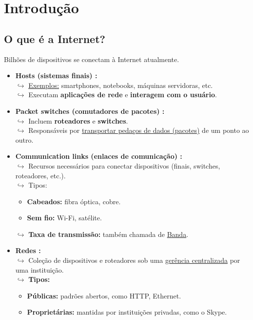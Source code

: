 \section{Introdução}

    \subsection{O que é a Internet?}

    Bilhões de dispositivos se conectam à Internet atualmente.

    \begin{itemize}
        \item \textbf{Hosts (sistemas finais) :} \\  
            $\hookrightarrow$ \underline{Exemplos:} smartphones, notebooks, máquinas servidoras, etc. \\  
            $\hookrightarrow$ Executam \textbf{aplicações de rede} e \textbf{interagem com o usuário}. 
        
        \item \textbf{Packet switches (comutadores de pacotes) :} \\          
            $\hookrightarrow$ Incluem \textbf{roteadores} e \textbf{switches}. \\  
            $\hookrightarrow$ Responsáveis por \underline{transportar pedaços de dados (pacotes)} de um ponto ao outro.

        \item \textbf{Communication links (enlaces de comunicação) :} \\  
            $\hookrightarrow$ Recursos necessários para conectar dispositivos (finais, switches, roteadores, etc.). \\  
            $\hookrightarrow$ Tipos: 
            \begin{itemize}
                \item \textbf{Cabeados:} fibra óptica, cobre.  
                \item \textbf{Sem fio:} Wi-Fi, satélite.
            \end{itemize}
            $\hookrightarrow$ \textbf{Taxa de transmissão:} também chamada de \underline{Banda}.

        \item \textbf{Redes :} \\  
            $\hookrightarrow$ Coleção de dispositivos e roteadores sob uma \underline{gerência centralizada} por uma instituição. \\  
            $\hookrightarrow$ \textbf{Tipos:}
            \begin{itemize}
                \item \textbf{Públicas:} padrões abertos, como HTTP, Ethernet.  
                \item \textbf{Proprietárias:} mantidas por instituições privadas, como o Skype.
            \end{itemize}


\end{itemize}
